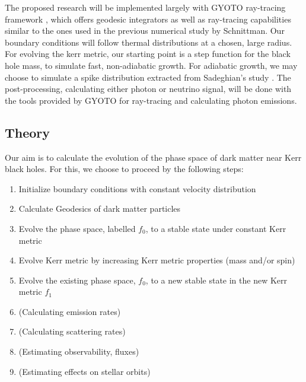 \documentclass[12pt]{article}
\begin{document}

The proposed research will be implemented largely with GYOTO ray-tracing framework \citep{gyoto_vincent_2011}, which 
offers geodesic integrators as well as ray-tracing capabilities similar to the ones used in the previous numerical study by 
Schnittman. Our boundary conditions will follow thermal distributions at a chosen, large radius. 
For evolving the kerr metric, our starting point is a step function for the black hole mass, to simulate fast, 
non-adiabatic growth. %
For adiabatic growth, we may choose to simulate a spike distribution extracted from Sadeghian's 
study \citep{Sadeghian_Ferrer_Will_2013}. The post-processing, calculating either photon or neutrino signal, 
will be done with the tools provided by GYOTO for ray-tracing and 
calculating photon emissions.

\subsection{Theory}


Our aim is to calculate the evolution of the phase space of dark matter near Kerr black holes. For this, we choose to proceed by the 
following steps:

\begin{enumerate}
 \item Initialize boundary conditions with constant velocity distribution
 \item Calculate Geodesics of dark matter particles
 \item Evolve the phase space, labelled $f_0$, to a stable state under constant Kerr metric %
 \item Evolve Kerr metric by increasing Kerr metric properties (mass and/or spin)
 \item Evolve the existing phase space, $f_0$, to a new stable state in the new Kerr metric $f_1$
 \item (Calculating emission rates) %
 \item (Calculating scattering rates) %
 \item (Estimating observability, fluxes) %
 \item (Estimating effects on stellar orbits) %
\end{enumerate}
\end{document}

